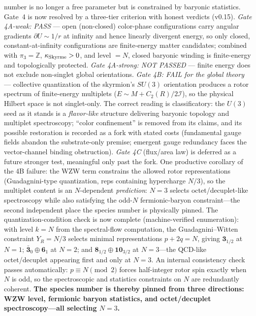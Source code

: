 \documentclass[11pt,a4paper]{article}
\begin{document}
number is no longer a free parameter but is constrained by
baryonic statistics.
Gate~4 is now resolved by a three-tier criterion with honest
verdicts (v0.15).
\emph{Gate 4A-weak: PASS} --- open (non-closed) color-phase
configurations carry angular gradients $\partial U \sim 1/r$ at
infinity and hence linearly divergent energy, so only closed,
constant-at-infinity configurations are finite-energy matter
candidates; combined with $\pi_3 = \mathbb{Z}$,
$\kappa_{\rm Skyrme} > 0$, and level $= N$, closed baryonic
winding is finite-energy and topologically protected.
\emph{Gate 4A-strong: NOT PASSED} --- finite energy does not
exclude non-singlet global orientations.
\emph{Gate 4B: FAIL for the global theory} --- collective
quantization of the skyrmion's $SU(3)$ orientation produces a
rotor spectrum of finite-energy multiplets
($E \sim M + C_2(R)/2\mathcal{I}$), so the physical Hilbert
space is not singlet-only.  The correct reading is
classificatory: the $U(3)$ seed as it stands is a
\emph{flavor-like} structure delivering baryonic topology and
multiplet spectroscopy; ``color confinement'' is removed from
its claims, and its possible restoration is recorded as a fork
with stated costs (fundamental gauge fields abandon the
substrate-only premise; emergent gauge redundancy faces the
vector-channel binding obstruction).
\emph{Gate 4C} (flux/area law) is deferred as a future stronger
test, meaningful only past the fork.
One productive corollary of the 4B failure: the WZW term
constrains the allowed rotor representations
(Guadagnini-type quantization, reps containing hypercharge
$N/3$), so the multiplet content is an $N$-dependent
\emph{prediction}: $N = 3$ selects octet/decuplet-like
spectroscopy while also satisfying the odd-$N$ fermionic-baryon
constraint---the second independent place the species number is
physically pinned.  The quantization-condition check is now complete
(machine-verified enumeration): with level $k = N$ from the
spectral-flow computation, the Guadagnini--Witten constraint
$Y_R = N/3$ selects minimal representations $p + 2q = N$, giving
$\mathbf{3}_{1/2}$ at $N{=}1$;
$\bar{\mathbf{3}}_0 \oplus \mathbf{6}_1$ at $N{=}2$; and
$\mathbf{8}_{1/2} \oplus \mathbf{10}_{3/2}$ at $N{=}3$---the
QCD-like octet/decuplet appearing first and only at $N = 3$.
An internal consistency check passes automatically:
$p \equiv N \pmod 2$ forces half-integer rotor spin exactly when
$N$ is odd, so the spectroscopic and statistics constraints on
$N$ are redundantly coherent.  \textbf{The species number is
thereby pinned from three directions: WZW level, fermionic
baryon statistics, and octet/decuplet spectroscopy---all
selecting $N = 3$.}
\end{document}
